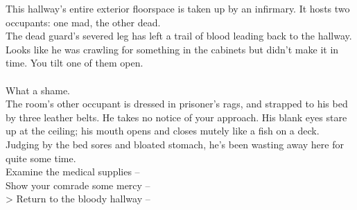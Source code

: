 This hallway's entire exterior floorspace is taken up by an infirmary. It hosts two occupants: one mad, the other dead.\\

The dead guard's severed leg has left a trail of blood leading back to the hallway. Looks like he was crawling for something in the cabinets but didn't make it in time. You tilt one of them open.\\
\\

What a shame.\\

The room's other occupant is dressed in prisoner's rags, and strapped to his bed by three leather belts. He takes no notice of your approach. His blank eyes stare up at the ceiling; his mouth opens and closes mutely like a fish on a deck. Judging by the bed sores and bloated stomach, he's been wasting away here for quite some time.\\

 Examine the medical supplies -- \\
 Show your comrade some mercy -- \\
> Return to the bloody hallway -- 